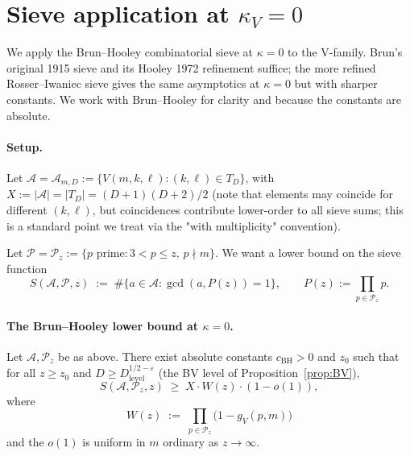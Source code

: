 \section{Sieve application at $\kappa_{V} = 0$}\label{sec:sieve}

We apply the Brun--Hooley combinatorial sieve at $\kappa = 0$ to the
V-family. Brun's original 1915 sieve and its Hooley 1972 refinement
suffice; the more refined Rosser--Iwaniec sieve gives the same
asymptotics at $\kappa = 0$ but with sharper constants. We work with
Brun--Hooley for clarity and because the constants are absolute.

\paragraph{Setup.}
Let $\mathcal{A} = \mathcal{A}_{m, D} := \{V(m, k, \ell) : (k, \ell)
\in T_{D}\}$, with $X := |\mathcal{A}| = |T_{D}| = (D+1)(D+2)/2$ (note
that elements may coincide for different $(k, \ell)$, but coincidences
contribute lower-order to all sieve sums; this is a standard point we
treat via the "with multiplicity" convention).

Let $\mathcal{P} = \mathcal{P}_{z} := \{p \text{ prime} : 3 < p \leq z,
\, p \nmid m\}$. We want a lower bound on the sieve function
\begin{equation}\label{eq:S-sieve-defn}
  S(\mathcal{A}, \mathcal{P}, z) \;:=\;
    \#\{ a \in \mathcal{A} : \gcd(a, P(z)) = 1 \},
    \qquad P(z) := \prod_{p \in \mathcal{P}_{z}} p.
\end{equation}

\paragraph{The Brun--Hooley lower bound at $\kappa = 0$.}

\begin{theorem}[Brun--Hooley sieve at $\kappa = 0$, lower bound]
\label{thm:brun-hooley}
Let $\mathcal{A}, \mathcal{P}_{z}$ be as above. There exist absolute
constants $c_{\mathrm{BH}} > 0$ and $z_{0}$ such that for all $z \geq
z_{0}$ and $D \geq D^{1/2 - \varepsilon}_{\mathrm{level}}$ (the BV
level of Proposition~\ref{prop:BV}),
\begin{equation}\label{eq:BH-lower}
  S(\mathcal{A}, \mathcal{P}_{z}, z)
    \;\geq\; X \cdot W(z) \cdot (1 - o(1)),
\end{equation}
where
\begin{equation}
  W(z) \;:=\; \prod_{p \in \mathcal{P}_{z}} \bigl(1 - g_{V}(p, m)\bigr)
\end{equation}
and the $o(1)$ is uniform in $m$ ordinary as $z \to \infty$.
\end{theorem}


